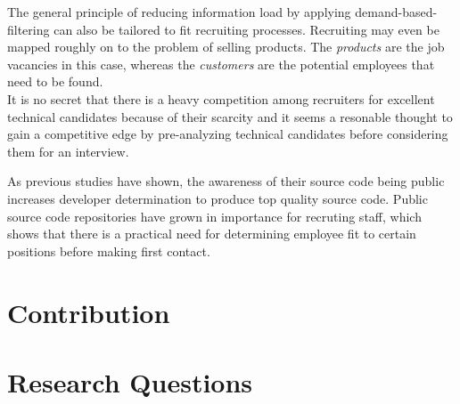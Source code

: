 
The general principle of reducing information load by applying
demand-based-filtering can also be tailored to fit recruiting processes.
Recruiting may even be mapped roughly on to the problem of selling products.
The \textit{products} are the job vacancies in this case, whereas the
\textit{customers} are the potential employees that need to be found.\\
It is no secret that there is a heavy competition among recruiters for excellent
technical candidates because of their scarcity and it seems a resonable thought
to gain a competitive edge by pre-analyzing technical candidates
before considering them for an interview.
\newline

As previous studies have shown, the awareness of their source
code being public increases developer determination
to produce top quality source code\cite{md:2013}.
Public source code repositories have grown in importance for recruting
staff, which shows that there is a practical need for determining
employee fit to certain positions before making first contact.

\section{Contribution}

\section{Research Questions} \label{sec:research-questions}

